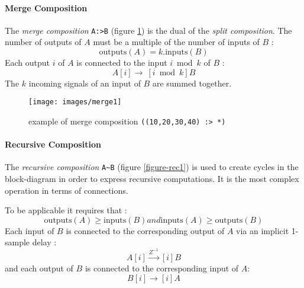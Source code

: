 \paragraph{Merge Composition}
The \emph{merge composition}  \lstinline$A:>B$ (figure \ref{figure-merge1}) is the dual of the \emph{split composition}. The number of outputs of $A$ must be a multiple of the number of inputs of $B$ : 
\begin{equation}
\mathrm{outputs}(A)=k.\mathrm{inputs}(B)                                                                                                                                                                                                                                                  \end{equation}
Each output $i$ of $A$ is connected to the input $i \bmod k$ of $B$ : 
\begin{equation}
A[i]\rightarrow\ [i \bmod k]B                                                                                                   \end{equation} 
The $k$ incoming signals of an input of $B$ are summed together.

\begin{figure}[h]
\centering 
\texttt{[image: images/merge1]} 
\caption{example of merge composition \lstinline'((10,20,30,40) :> *)'}  
\label{figure-merge1}
\end{figure}


\paragraph{Recursive Composition}
The \emph{recursive composition} \lstinline'A~B' (figure \ref{figure-rec1}) is used to create cycles in the block-diagram in order to express recursive computations. It is the most complex operation in terms of connections.

To be applicable it requires that :
\begin{equation}
\mathrm{outputs}(A) \geq \mathrm{inputs}(B) and \mathrm{inputs}(A) \geq \mathrm{outputs}(B)                                                                                               \end{equation}
Each input of $B$ is connected to the corresponding output of $A$ via an implicit 1-sample delay : 
\begin{equation}
A[i]\stackrel{Z^{-1}}{\rightarrow}[i]B
\end{equation} 
and each output of $B$ is connected to the corresponding input of $A$:
\begin{equation}
B[i]\rightarrow [i]A
\end{equation} 

